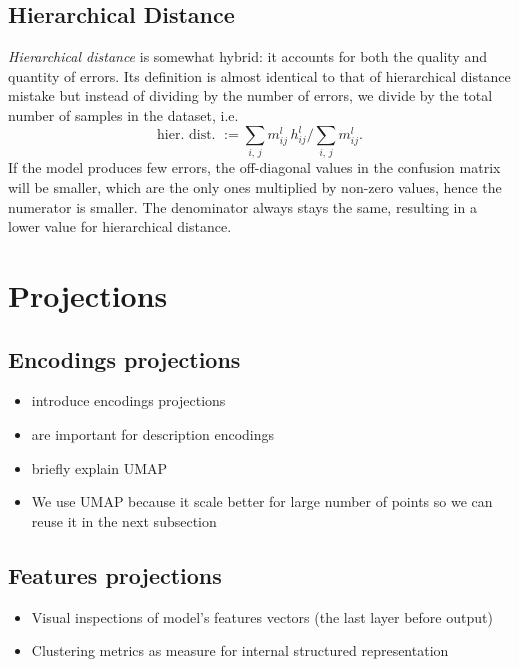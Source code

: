 \subsection{Hierarchical Distance}
\label{subsec:hierarchical-distance}
\emph{Hierarchical distance} is somewhat hybrid: it accounts for both the quality and quantity of errors. Its definition is almost identical to that of hierarchical distance mistake but instead of dividing by the number of errors, we divide by the total number of samples in the dataset, i.e.\
\begin{equation}
  \textrm{hier.\ dist.\ } :=
  \sum_{i, \, j} m_{ij}^l \, h_{ij}^l \bigg/ \sum_{i, \, j} m_{ij}^l.
  \label{eq:hierarchical-distance}
\end{equation}
If the model produces few errors, the off-diagonal values in the confusion matrix will be smaller, which are the only ones multiplied by non-zero values, hence the numerator is smaller. The denominator always stays the same, resulting in a lower value for hierarchical distance.

\section{Projections}
\label{sec:projections}

\subsection{Encodings projections}
\label{subsec:encodings-projections}
\begin{itemize}
  \item introduce encodings projections
  \item are important for description encodings
  \item briefly explain UMAP
  \item  We use UMAP because it scale better for large number of points so we
    can reuse it in the next subsection
\end{itemize}

\subsection{Features projections}
\label{subsec:features-projections}
\begin{itemize}
  \item Visual inspections of model's features vectors (the last layer before
    output)
  \item Clustering metrics as measure for internal structured representation
\end{itemize}



